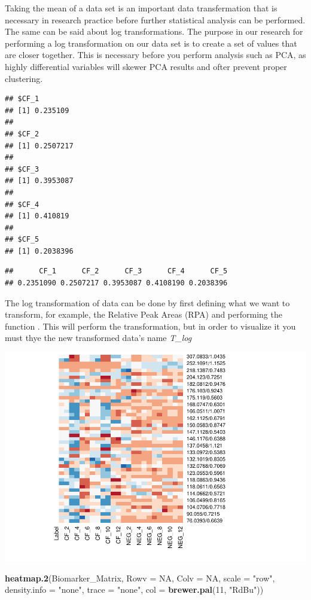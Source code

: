 \documentclass[]{elsarticle} %
\makeatletter
\newenvironment{Shaded}{\begin{snugshade}}{\end{snugshade}}
\newcommand{\DataTypeTok}[1]{\textcolor[rgb]{0.13,0.29,0.53}{#1}}
\newcommand{\DecValTok}[1]{\textcolor[rgb]{0.00,0.00,0.81}{#1}}
\newcommand{\KeywordTok}[1]{\textcolor[rgb]{0.13,0.29,0.53}{\textbf{#1}}}
\newcommand{\NormalTok}[1]{#1}
\newcommand{\OtherTok}[1]{\textcolor[rgb]{0.56,0.35,0.01}{#1}}
\newcommand{\StringTok}[1]{\textcolor[rgb]{0.31,0.60,0.02}{#1}}
\def\maxwidth{\ifdim\Gin@nat@width>\linewidth\linewidth
\else\Gin@nat@width\fi}
\let\Oldincludegraphics\includegraphics
\renewcommand{\includegraphics}[1]{\Oldincludegraphics[width=\maxwidth]{#1}}
\makeatother
\begin{document}
Taking the mean of a data set is an important data transfermation that
is necessary in research practice before further statistical analysis
can be performed. The same can be said about log transformations. The
purpose in our research for performing a log transformation on our data
set is to create a set of values that are closer together. This is
necessary before you perform analysis such as PCA, as highly
differential variables will skewer PCA results and ofter prevent proper
clustering.

\begin{verbatim}
## $CF_1
## [1] 0.235109
## 
## $CF_2
## [1] 0.2507217
## 
## $CF_3
## [1] 0.3953087
## 
## $CF_4
## [1] 0.410819
## 
## $CF_5
## [1] 0.2038396
\end{verbatim}

\begin{verbatim}
##      CF_1      CF_2      CF_3      CF_4      CF_5 
## 0.2351090 0.2507217 0.3953087 0.4108190 0.2038396
\end{verbatim}

The log transformation of data can be done by first defining what we
want to transform, for example, the Relative Peak Areas (RPA) and
performing the function . This will perform the transformation, but in
order to visualize it you must thye the new transformed data's name
\emph{T\_log}

\includegraphics{FinalDeliverableArticle_files/figure-latex/unnamed-chunk-3-1.pdf}

\begin{Shaded}
\begin{Highlighting}[]
\KeywordTok{heatmap.2}\NormalTok{(Biomarker_Matrix, }\DataTypeTok{Rowv =} \OtherTok{NA}\NormalTok{, }\DataTypeTok{Colv =} \OtherTok{NA}\NormalTok{, }\DataTypeTok{scale =} \StringTok{"row"}\NormalTok{, }\DataTypeTok{density.info =} \StringTok{"none"}\NormalTok{, }\DataTypeTok{trace =} \StringTok{"none"}\NormalTok{, }\DataTypeTok{col =}  \KeywordTok{brewer.pal}\NormalTok{(}\DecValTok{11}\NormalTok{, }\StringTok{"RdBu"}\NormalTok{))}
\end{Highlighting}
\end{Shaded}
\end{document}
